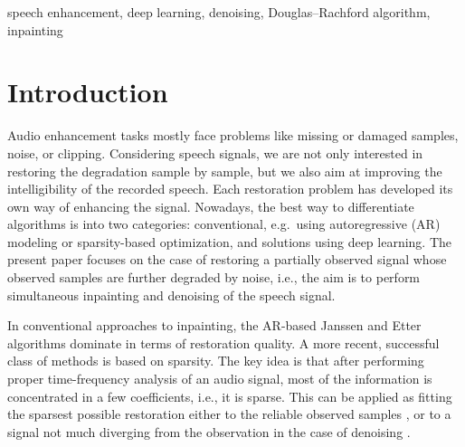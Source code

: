 \documentclass[conference]{IEEEtran}
\newcommand{\todo}[1]{\textcolor{red}{#1}}
\begin{document}
\begin{IEEEkeywords}
speech enhancement, deep learning, denoising, Douglas--Rachford algorithm, inpainting
\end{IEEEkeywords}

\section{Introduction}


Audio enhancement tasks mostly face problems like missing or damaged samples, noise, or clipping.
Considering speech signals, we %
are not only interested in restoring the degradation sample by sample, but we also aim at improving the intelligibility of the recorded speech.
Each restoration problem has developed its own way of enhancing the signal.
Nowadays, the best way to differentiate algorithms is into two categories:
conventional, e.g.\ using autoregressive (AR) modeling or sparsity-based optimization, and solutions using deep learning.
The present paper focuses on the case of restoring a partially observed signal whose observed samples are further degraded by noise, i.e., the aim is to perform simultaneous inpainting and denoising of the speech signal.

In conventional approaches to inpainting, the AR-based Janssen \cite{Janssen1986} and Etter~\cite{Etter1996} algorithms dominate in terms of restoration quality.
A more recent, successful class of methods is based on sparsity.
The key idea is that after performing proper time-frequency analysis of an audio signal,
most of the information is concentrated in a few coefficients, i.e., it is sparse.
This can be applied as fitting the sparsest possible restoration either to the reliable observed samples \cite{Adler2012, Kitic2015, Zaviska2019, Mokry2019}, or to a signal not much diverging from the observation in the case of denoising \cite{Kowalski2013}.
\end{document}
